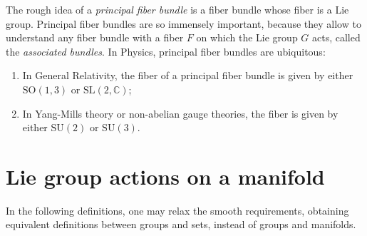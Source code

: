 The rough idea of a \emph{principal fiber bundle} is a fiber bundle whose fiber is a Lie group. Principal fiber bundles are so immensely important, because they allow to understand any fiber bundle with a fiber \(F\) on which the Lie group \(G\) acts, called the \emph{associated bundles}. In Physics, principal fiber bundles are ubiquitous:
\begin{enumerate}[label=(\alph*)]
    \item In General Relativity, the fiber of a principal fiber bundle is given by either \(\mathrm{SO}(1,3)\) or \(\mathrm{SL}(2,\mathbb{C})\);
    \item In Yang-Mills theory or non-abelian gauge theories, the fiber is given by either \(\mathrm{SU}(2)\) or \(\mathrm{SU}(3).\)
\end{enumerate}

\section{Lie group actions on a manifold}
In the following definitions, one may relax the smooth requirements, obtaining equivalent definitions between groups and sets, instead of groups and manifolds.

